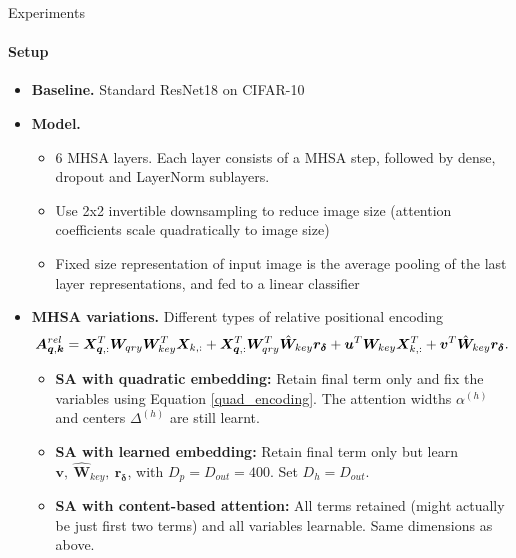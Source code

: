 \documentclass[9pt]{beamer}
\newcommand{\mb}{\bm}
\begin{document}
\begin{frame}{Experiments}
\framesubtitle{Setup}
\begin{itemize}
\item \textbf{Baseline.} Standard ResNet18 on CIFAR-10

\vspace{.02in}
\item \textbf{Model.}
\begin{itemize}
    \item 6 MHSA layers. Each layer consists of a MHSA step, followed by dense, dropout and LayerNorm sublayers.
    \item Use 2x2 invertible downsampling to reduce image size (attention coefficients scale quadratically to image size)
    \item Fixed size representation of input image is the average pooling of the last layer representations, and fed to a linear classifier
\end{itemize}

\vspace{.02in}
\item \textbf{MHSA variations.} Different types of relative positional encoding
\begin{equation*}
    \mb A^{rel}_{\mb q, \mb k} = 
        \mb X_{\mb q,:}^T \WW \mb X_{k,:}
        + \mb X_{\mb q,:}^T \mb W_{qry}^T\hat{\mb W}_{key} \mb r_{\mb \delta}
        + \mb u^T \mb W_{key} \mb X^T_{k,:}
        + \mb v^T \hat{\mb W}_{key} \mb r_{\bm\delta}.
    \vspace{-.12in}
\end{equation*}
\begin{itemize}
    \item \textbf{SA with quadratic embedding:}  Retain final term only and fix the variables using Equation \eqref{quad_encoding}. The attention widths $\alpha^{(h)}$ and centers $\varDelta^{(h)}$ are still learnt.
    \item \textbf{SA with learned embedding:} Retain final term only but learn $\mathbf v,\ \hat{\mathbf W}_{key},\ \mathbf r_{\bm \delta}$, with $D_p=D_{out}=400$. Set $D_h=D_{out}$.
    \item \textbf{SA with content-based attention:} All terms retained (might actually be just first two terms) and all variables learnable. Same dimensions as above.
\end{itemize}
\end{itemize}
\end{frame}
\end{document}
